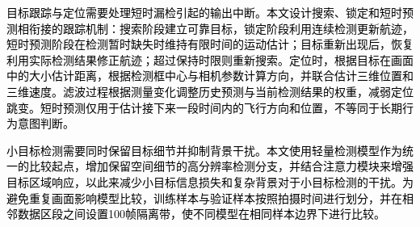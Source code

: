 \textcolor{black}{目标跟踪与定位需要处理短时漏检引起的输出中断。本文设计搜索、锁定和短时预测相衔接的跟踪机制：搜索阶段建立可靠目标，锁定阶段利用连续检测更新航迹，短时预测阶段在检测暂时缺失时维持有限时间的运动估计；目标重新出现后，恢复利用实际检测结果修正航迹；超过保持时限则重新搜索。定位时，根据目标在画面中的大小估计距离，根据检测框中心与相机参数计算方向，并联合估计三维位置和三维速度。滤波过程根据测量变化调整历史预测与当前检测结果的权重，减弱定位跳变。短时预测仅用于估计接下来一段时间内的飞行方向和位置，不等同于长期行为意图判断。}

\textcolor{black}{小目标检测需要同时保留目标细节并抑制背景干扰。本文使用轻量检测模型作为统一的比较起点，增加保留空间细节的高分辨率检测分支，并结合注意力模块来增强目标区域响应\cite{ema}，以此来减少小目标信息损失和复杂背景对于小目标检测的干扰。为避免重复画面影响模型比较，训练样本与验证样本按照拍摄时间进行划分，并在相邻数据区段之间设置100帧隔离带，使不同模型在相同样本边界下进行比较。}






